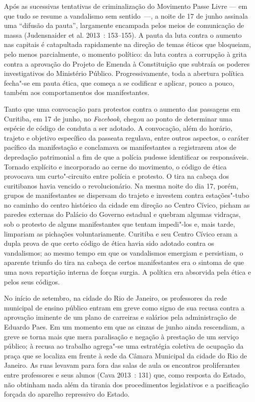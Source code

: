 Após as sucessivas tentativas de
criminalização do Movimento Passe Livre --- em que tudo se resume a
vandalismo sem sentido~---, a noite de 17 de junho assinala uma ``difusão
da pauta'', largamente encampada pelos meios de comunicação de massa
(Judensnaider et al. 2013~: 153--155). A pauta da luta contra o aumento
nas capitais é catapultada rapidamente na direção de temas éticos que
bloqueiam, pelo menos parcialmente, o momento político: da luta contra a
corrupção à grita contra a aprovação do Projeto de Emenda à Constituição
que subtraía os poderes investigativos do Ministério Público.
Progressivamente, toda a abertura política fecha"-se em pauta ética, que
começa a se codificar e aplicar, pouco a pouco, também aos
comportamentos dos manifestantes.

Tanto que uma convocação para protestos contra o aumento das passagens
em Curitiba, em 17 de junho, no \emph{Facebook}, chegou ao ponto de
determinar uma espécie de código de conduta a ser adotado. A convocação,
além do horário, trajeto e objetivo específico da passeata regulava,
entre outros aspectos, o caráter pacífico da manifestação e conclamava
os manifestantes a registrarem atos de depredação patrimonial a fim de
que a polícia pudesse identificar os responsáveis. Tornado explícito e
incorporado ao cerne do movimento, o código de ética provocava um
curto"-circuito entre polícia e protesto. O tira na cabeça dos
curitibanos havia vencido o revolucionário. Na mesma noite do dia 17,
porém, grupos de manifestantes se dispersam do trajeto e investem contra
estações"-tubo no caminho do centro histórico da cidade em direção ao
Centro Cívico, picham as paredes externas do Palácio do Governo estadual
e quebram algumas vidraças, sob o protesto de alguns manifestantes que
tentam impedi"-los e, mais tarde, limpariam as pichações voluntariamente.
Curitiba e seu Centro Cívico eram a dupla prova de que certo código de
ética havia sido adotado contra os vandalismos; ao mesmo tempo em que os
vandalismos emergiam e persistiam, o aparente triunfo do tira na cabeça
de certos manifestantes era o sintoma de que uma nova repartição interna
de forças surgia. A política era absorvida pela ética e pelos seus
códigos.

No início de setembro, na cidade do Rio de Janeiro, os professores da
rede municipal de ensino público entram em greve como signo de sua
recusa contra a aprovação iminente de um plano de carreiras e salários
pela administração de Eduardo Paes. Em um momento em que as cinzas de
junho ainda rescendiam, a greve se torna mais que mera paralisação e
negação à prestação de um serviço público; à recusa ao trabalho
agrega"-se uma estratégia coletiva de ocupação da praça que se localiza
em frente à sede da Câmara Municipal da cidade do Rio de Janeiro. As
ruas levavam para fora das salas de aula os encontros proliferantes
entre professores e seus alunos (Cava 2013~: 131) que, como resposta do
Estado, não obtinham nada além da tirania dos procedimentos legislativos
e a pacificação forçada do aparelho repressivo do Estado.

